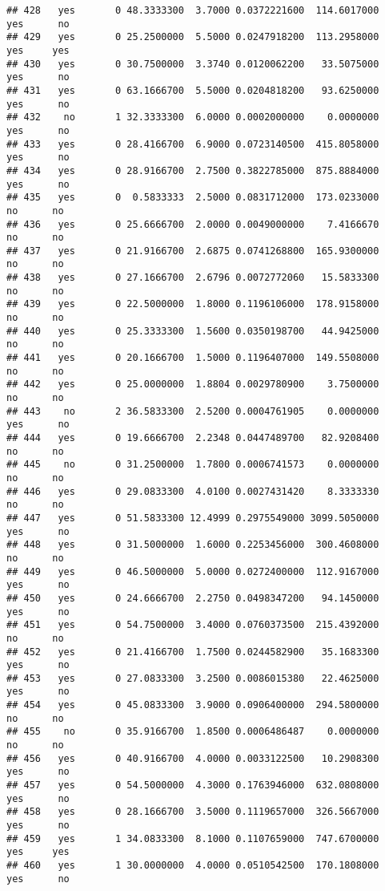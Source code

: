 \documentclass[]{article}
\begin{document}
\begin{verbatim}
## 428   yes       0 48.3333300  3.7000 0.0372221600  114.6017000   yes      no
## 429   yes       0 25.2500000  5.5000 0.0247918200  113.2958000   yes     yes
## 430   yes       0 30.7500000  3.3740 0.0120062200   33.5075000   yes      no
## 431   yes       0 63.1666700  5.5000 0.0204818200   93.6250000   yes      no
## 432    no       1 32.3333300  6.0000 0.0002000000    0.0000000   yes      no
## 433   yes       0 28.4166700  6.9000 0.0723140500  415.8058000   yes      no
## 434   yes       0 28.9166700  2.7500 0.3822785000  875.8884000   yes      no
## 435   yes       0  0.5833333  2.5000 0.0831712000  173.0233000    no      no
## 436   yes       0 25.6666700  2.0000 0.0049000000    7.4166670    no      no
## 437   yes       0 21.9166700  2.6875 0.0741268800  165.9300000    no      no
## 438   yes       0 27.1666700  2.6796 0.0072772060   15.5833300    no      no
## 439   yes       0 22.5000000  1.8000 0.1196106000  178.9158000    no      no
## 440   yes       0 25.3333300  1.5600 0.0350198700   44.9425000    no      no
## 441   yes       0 20.1666700  1.5000 0.1196407000  149.5508000    no      no
## 442   yes       0 25.0000000  1.8804 0.0029780900    3.7500000    no      no
## 443    no       2 36.5833300  2.5200 0.0004761905    0.0000000   yes      no
## 444   yes       0 19.6666700  2.2348 0.0447489700   82.9208400    no      no
## 445    no       0 31.2500000  1.7800 0.0006741573    0.0000000    no      no
## 446   yes       0 29.0833300  4.0100 0.0027431420    8.3333330    no      no
## 447   yes       0 51.5833300 12.4999 0.2975549000 3099.5050000   yes      no
## 448   yes       0 31.5000000  1.6000 0.2253456000  300.4608000    no      no
## 449   yes       0 46.5000000  5.0000 0.0272400000  112.9167000   yes      no
## 450   yes       0 24.6666700  2.2750 0.0498347200   94.1450000   yes      no
## 451   yes       0 54.7500000  3.4000 0.0760373500  215.4392000    no      no
## 452   yes       0 21.4166700  1.7500 0.0244582900   35.1683300   yes      no
## 453   yes       0 27.0833300  3.2500 0.0086015380   22.4625000   yes      no
## 454   yes       0 45.0833300  3.9000 0.0906400000  294.5800000    no      no
## 455    no       0 35.9166700  1.8500 0.0006486487    0.0000000    no      no
## 456   yes       0 40.9166700  4.0000 0.0033122500   10.2908300   yes      no
## 457   yes       0 54.5000000  4.3000 0.1763946000  632.0808000   yes      no
## 458   yes       0 28.1666700  3.5000 0.1119657000  326.5667000   yes      no
## 459   yes       1 34.0833300  8.1000 0.1107659000  747.6700000   yes     yes
## 460   yes       1 30.0000000  4.0000 0.0510542500  170.1808000   yes      no

\end{verbatim}
\end{document}
